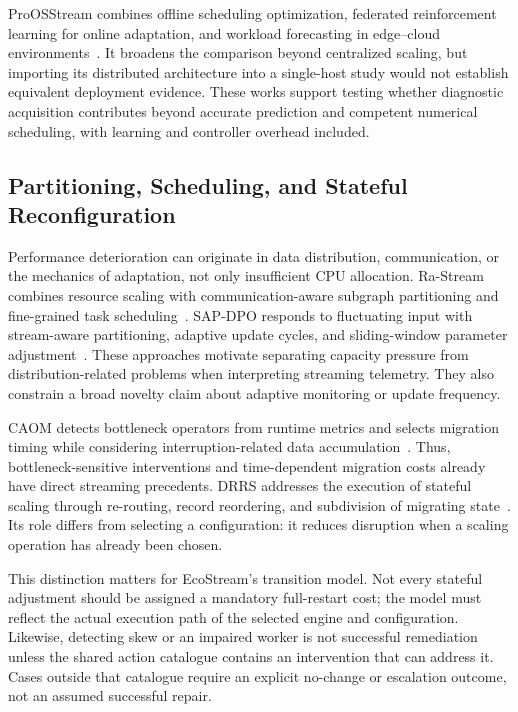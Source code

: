 ProOSStream combines offline scheduling optimization, federated reinforcement learning for online adaptation, and workload forecasting in edge--cloud environments~\cite{lajili2026proosstream}. It broadens the comparison beyond centralized scaling, but importing its distributed architecture into a single-host study would not establish equivalent deployment evidence. These works support testing whether diagnostic acquisition contributes beyond accurate prediction and competent numerical scheduling, with learning and controller overhead included.

\subsection{Partitioning, Scheduling, and Stateful Reconfiguration}
Performance deterioration can originate in data distribution, communication, or the mechanics of adaptation, not only insufficient CPU allocation. Ra-Stream combines resource scaling with communication-aware subgraph partitioning and fine-grained task scheduling~\cite{fan2026rastream}. SAP-DPO responds to fluctuating input with stream-aware partitioning, adaptive update cycles, and sliding-window parameter adjustment~\cite{ren2026sapdpo}. These approaches motivate separating capacity pressure from distribution-related problems when interpreting streaming telemetry. They also constrain a broad novelty claim about adaptive monitoring or update frequency.

CAOM detects bottleneck operators from runtime metrics and selects migration timing while considering interruption-related data accumulation~\cite{tan2025caom}. Thus, bottleneck-sensitive interventions and time-dependent migration costs already have direct streaming precedents. DRRS addresses the execution of stateful scaling through re-routing, record reordering, and subdivision of migrating state~\cite{qing2025drrs}. Its role differs from selecting a configuration: it reduces disruption when a scaling operation has already been chosen.

This distinction matters for EcoStream's transition model. Not every stateful adjustment should be assigned a mandatory full-restart cost; the model must reflect the actual execution path of the selected engine and configuration. Likewise, detecting skew or an impaired worker is not successful remediation unless the shared action catalogue contains an intervention that can address it. Cases outside that catalogue require an explicit no-change or escalation outcome, not an assumed successful repair.

